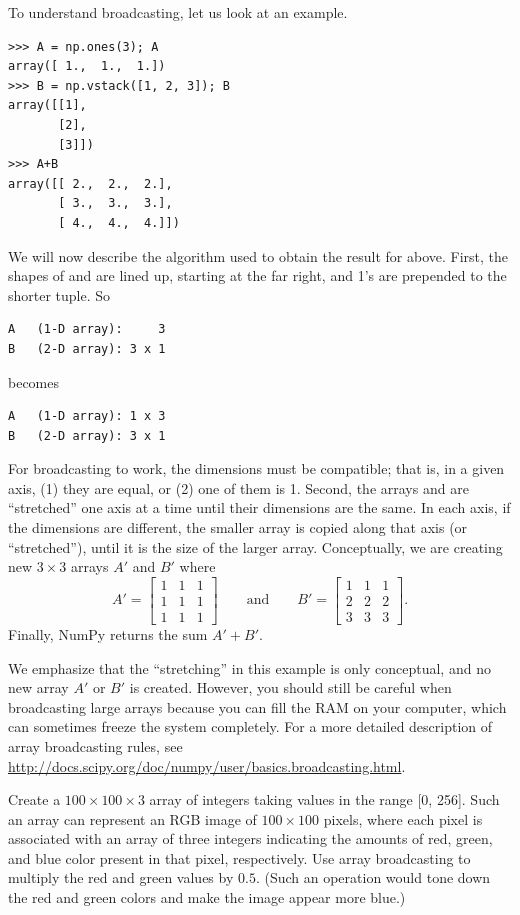 To understand broadcasting, let us look at an example. 
\begin{lstlisting}
>>> A = np.ones(3); A
array([ 1.,  1.,  1.])
>>> B = np.vstack([1, 2, 3]); B
array([[1],
       [2],
       [3]])
>>> A+B
array([[ 2.,  2.,  2.],
       [ 3.,  3.,  3.],
       [ 4.,  4.,  4.]])
\end{lstlisting}
We will now describe the algorithm used to obtain the result for  above. First, the shapes of  and  are lined up, starting at the far right, and 1's are prepended to the shorter tuple. So
\begin{lstlisting}
A 	(1-D array):     3
B	(2-D array): 3 x 1
\end{lstlisting}
becomes
\begin{lstlisting}
A 	(1-D array): 1 x 3
B	(2-D array): 3 x 1
\end{lstlisting}
For broadcasting to work, the dimensions must be compatible; that is, in a given axis, (1) they are equal, or (2) one of them is 1. Second, the arrays  and  are ``stretched'' one axis at a time until their dimensions are the same. In each axis, if the dimensions are different, the smaller array is copied along that axis (or ``stretched''), until it is the size of the larger array. Conceptually, we are creating new $3 \times 3$ arrays $A'$ and $B'$ where
\[
A' = \left[ \begin{array}{ccc}
1 & 1 & 1\\
1 & 1 & 1\\
1 & 1 & 1 \end{array} \right] \qquad \text{and} \qquad B' =  \left[ \begin{array}{ccc}
1 & 1 & 1\\
2 & 2 & 2\\
3 & 3 & 3\end{array} \right].
\]
Finally, NumPy returns the sum $A'+B'$.

We emphasize that the ``stretching'' in this example is only conceptual, and no new array $A'$ or $B'$ is created. However, 
you should still be careful when broadcasting large arrays because you can fill the 
RAM on your computer, which can sometimes freeze the system completely.
For a more detailed description of array broadcasting rules, see 
\url{http://docs.scipy.org/doc/numpy/user/basics.broadcasting.html}.

\begin{problem}
Create a $100\times100\times3$ array of integers taking values in the range 
[0, 256]. Such an array can represent an RGB image of $100\times100$ pixels, 
where each pixel is associated with an array of three integers indicating the 
amounts of red, green, and blue color present in that pixel, respectively.
Use array broadcasting to multiply the red and green values by $0.5$. 
(Such an operation would tone down the red and green colors and make the 
image appear more blue.) 
\end{problem}

